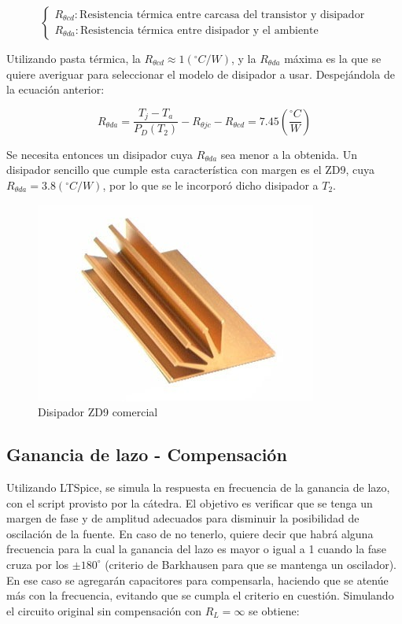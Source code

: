 \[
\left\lbrace
\begin{array}{l}
R_{\theta cd}: \textrm{Resistencia t\'ermica entre carcasa del transistor y disipador} \\
R_{\theta da}: \textrm{Resistencia t\'ermica entre disipador y el ambiente}
\end{array}
\right.
\] 

Utilizando pasta t\'ermica, la $R_{\theta cd} \approx 1(^{\circ}C/W)$, y la $R_{\theta da}$ m\'axima es la que se quiere averiguar para seleccionar el modelo de disipador a usar. Despej\'andola de la ecuaci\'on anterior:

\[
R_{\theta da} = \frac{T_j - T_a}{P_D(T_2)} - R_{\theta jc} - R_{\theta cd} = 7.45 \left(\frac{^{\circ}C}{W}\right)
\]
 
Se necesita entonces un disipador cuya $R_{\theta da}$ sea menor a la obtenida. Un disipador sencillo que cumple esta caracter\'istica con margen es el ZD9, cuya $R_{\theta da} = 3.8(^{\circ}C/W)$, por lo que se le incorpor\'o dicho disipador a $T_2$. 
 
\begin{figure}[!ht]
\begin{centering}
\includegraphics[scale=0.7]{Imagenes/ZD9.jpg}
\par\end{centering}
\caption{Disipador ZD9 comercial}

\end{figure}
 
\newpage 
 
\subsection{Ganancia de lazo - Compensaci\'on}

Utilizando LTSpice, se simula la respuesta en frecuencia de la ganancia de lazo, con el script provisto por la c\'atedra. El objetivo es verificar que se tenga un margen de fase y de amplitud adecuados para disminuir la posibilidad de oscilaci\'on de la fuente. En caso de no tenerlo, quiere decir que habr\'a alguna frecuencia para la cual la ganancia del lazo es mayor o igual a 1 cuando la fase cruza por los $\pm 180^{\circ}$ (criterio de Barkhausen para que se mantenga un oscilador). En ese caso se agregar\'an capacitores para compensarla, haciendo que se aten\'ue m\'as con la frecuencia, evitando que se cumpla el criterio en cuesti\'on.
Simulando el circuito original sin compensaci\'on con $R_L = \infty$ se obtiene:


